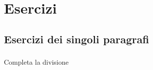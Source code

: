 
\section{Esercizi}

\subsection{Esercizi dei singoli paragrafi}

\subsubsection*{}

\begin{esercizio}
\label{ese:12.1}
Completa la divisione
{\esedivisionea}
\end{esercizio}

